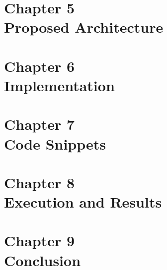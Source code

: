 \documentclass[12pt, oneside]{report}
\begin{document}
\part*{Chapter 5\\ Proposed Architecture}

\par

\part*{Chapter 6\\ Implementation}

\par

\part*{Chapter 7\\ Code Snippets}

\par

\part*{Chapter 8\\ Execution and Results}

\par

\part*{Chapter 9\\ Conclusion}

\par\clearpage
{}

\par
\end{document}
